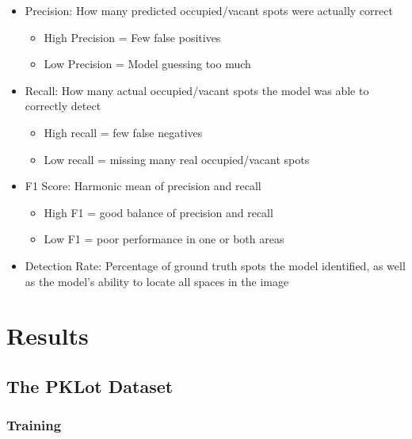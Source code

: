 \documentclass[12pt, letterpaper, oneside]{article}
\begin{document}
\begin{itemize}
    \item Precision: How many predicted occupied/vacant spots were actually correct

    \begin{itemize}
        \item High Precision = Few false positives
        \item Low Precision = Model guessing too much
    \end{itemize}

    \item Recall: How many actual occupied/vacant spots the model was able to correctly detect

    \begin{itemize}
        \item High recall = few false negatives

        \item Low recall = missing many real occupied/vacant spots

    \end{itemize}

    \item F1 Score: Harmonic mean of precision and recall

    \begin{itemize}
        \item High F1 = good balance of precision and recall

        \item Low F1 = poor performance in one or both areas

    \end{itemize}

    \item Detection Rate: Percentage of ground truth spots the model identified, as well as the model’s ability to locate all spaces in the image
\end{itemize}

\section{Results}
\label{sec:results}

\subsection{The PKLot Dataset}
\subsubsection{Training}
\end{document}
